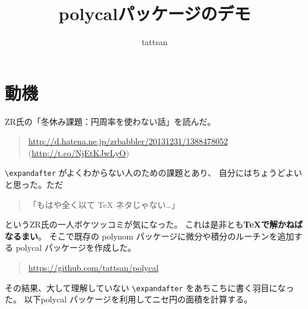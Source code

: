 \documentclass[dvipdfmx]{jsarticle}
\title{\textsf{polycal}パッケージのデモ}\author{tattsan}\date{}
\begin{document}
\maketitle

\section{動機}
ZR氏の「冬休み課題：円周率を使わない話」を読んだ。
\begin{quote}
  \url{http://d.hatena.ne.jp/zrbabbler/20131231/1388478052}
  (\url{http://t.co/NjEtKJwLyO})
\end{quote}
\verb+\expandafter+  がよくわからない人のための課題とあり、
自分にはちょうどよいと思った。ただ
\begin{quote}
  「もはや全く以て TeX ネタじゃない…」  
\end{quote}
というZR氏の一人ボケツッコミが気になった。
これは是非とも\textbf{\TeX で解かねばなるまい}。
そこで既存の \textsf{polynom} パッケージに微分や積分のルーチンを追加する
\textsf{polycal} パッケージを作成した。
\begin{quote}
  \url{https://github.com/tattsan/polycal}
\end{quote}
その結果、大して理解していない \verb|\expandafter| をあちこちに書く羽目になった。
以下\textsf{polycal} パッケージを利用してニセ円の面積を計算する。
\end{document}
